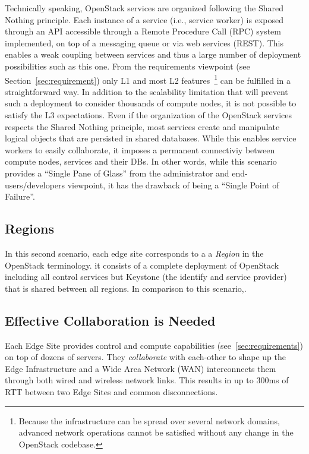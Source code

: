 %
Technically speaking, OpenStack services are organized following the
Shared Nothing principle. Each instance of a service (i.e., service
worker) is exposed through an API accessible through a Remote
Procedure Call (RPC) system implemented, on top of a messaging queue
or via web services (REST). This enables a weak coupling between
services and thus a large number of deployment possibilities such as
this one.
%
From the requirements viewpoint (see Section~\ref{sec:requirement}) only L1
and most L2 features~\footnote{Because the infrastructure can
  be spread over several network domains, advanced network operations
  cannot be satisfied without any change in the OpenStack codebase.}
can be fulfilled in a straightforward way.  In addition to
the scalability limitation that will prevent such a deployment to 
consider thousands of compute nodes, it is not possible to satisfy the
L3 expectations.
%
Even if the organization of the OpenStack services respects the Shared
Nothing principle, most services create and manipulate logical objects
that are persisted in shared databases. While this enables service
workers to easily collaborate, it imposes a permanent connectiviy
between compute nodes, services and their DBs. In other words, while
this scenario provides a ``Single Pane of Glass'' from the
administrator and end-users/developers viewpoint, it has the drawback
of being a ``Single Point of Failure''.


\subsection{Regions}
In this second scenario, each edge site corresponds to a a
\emph{Region} in the OpenStack terminology. it consists of a complete
deployment of OpenStack including all control services but Keystone
(\ie the identify and service provider) that is shared between all
regions.
In comparison to this scenario,.


\subsection{Effective Collaboration is Needed}
Each Edge Site
provides control and compute capabilities (see~\ref{sec:requirements})
on top of dozens of servers. They \emph{collaborate} with each-other
to shape up the Edge Infrastructure and a Wide Area Network (WAN)
interconnects them through both wired and wireless network links. This
results in up to 300ms of RTT between two Edge Sites and common
disconnections.

